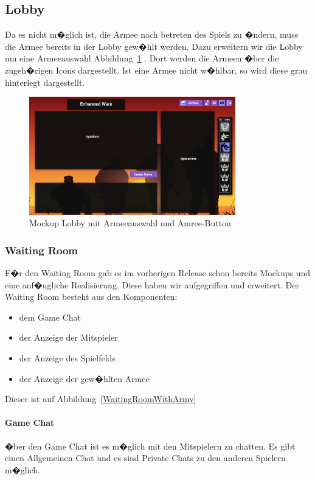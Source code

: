 \documentclass[12pt, titlepage]{scrartcl}
\newcommand{\Abb}[1]{%
	Abbildung\ \ref{#1}%
}
\begin{document}
		\subsection{Lobby}
		Da es nicht m�glich ist, die Armee nach betreten des Spiels zu �ndern, muss die Armee bereits in der Lobby gew�hlt werden. Dazu erweitern wir die Lobby um eine Armeeauswahl \Abb{Lobby_with_Army}. Dort werden die Armeen �ber die zugeh�rigen Icons dargestellt. Ist eine Armee nicht w�hlbar, so wird diese grau hinterlegt dargestellt. 
		\begin{figure}[H] 
			\centering
			\includegraphics[width=0.8\textwidth]{Lobby_mit_Army_Button_und_Armeeliste.png}
			\caption{Mockup Lobby mit Armeeauswahl und Amree-Button}
			\label{Lobby_with_Army}
		\end{figure}
		
		\subsubsection{Waiting Room}
		F�r den Waiting Room gab es im vorherigen Release schon bereits Mockups und eine anf�ngliche Realisierung. Diese haben wir aufgegriffen und erweitert. Der Waiting Room besteht aus den Komponenten:
		\begin{itemize}
			\item dem Game Chat
			\item der Anzeige der Mitspieler
			\item der Anzeige des Spielfelds
			\item der Anzeige der gew�hlten Armee
		\end{itemize}
		Dieser ist auf \Abb{WaitingRoomWithArmy}
		\paragraph{Game Chat}
		�ber den Game Chat ist es m�glich mit den Mitspielern zu chatten. Es gibt einen Allgemeinen Chat und es sind Private Chats zu den anderen Spielern m�glich.
\end{document}
